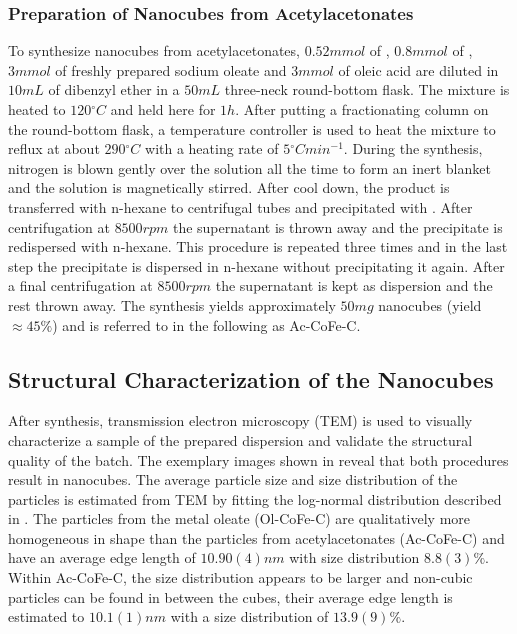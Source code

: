 \documentclass[\main/dresen_thesis.tex]{subfiles}
\begin{document}
    \subsubsection{Preparation of Nanocubes from Acetylacetonates}
      To synthesize nanocubes from acetylacetonates, $0.52 \unit{mmol}$ of , $0.8 \unit{mmol}$ of , $3 \unit{mmol}$ of freshly prepared sodium oleate and $3 \unit{mmol}$ of oleic acid are diluted in $10 \unit{mL}$ of dibenzyl ether in a $50 \unit{mL}$ three-neck round-bottom flask.
      The mixture is heated to $120 \unit{^\circ C}$ and held here for $1 \unit{h}$.
      After putting a fractionating column on the round-bottom flask, a temperature controller is used to heat the mixture to reflux at about $290 \unit{^\circ C}$ with a heating rate of $5 \unit{^\circ C min^{-1}}$.
      During the synthesis, nitrogen is blown gently over the solution all the time to form an inert blanket and the solution is magnetically stirred.
      After cool down, the product is transferred with n-hexane to centrifugal tubes and precipitated with .
      After centrifugation at $8500 \unit{rpm}$ the supernatant is thrown away and the precipitate is redispersed with n-hexane.
      This procedure is repeated three times and in the last step the precipitate is dispersed in n-hexane without precipitating it again.
      After a final centrifugation at $8500 \unit{rpm}$ the supernatant is kept as dispersion and the rest thrown away.
      The synthesis yields approximately $50 \unit{mg}$ nanocubes (yield $\approx 45 \%$) and is referred to in the following as Ac-CoFe-C.

  \subsection{Structural Characterization of the Nanocubes}
  \label{sec:monolayers:nanoparticle:structuralCharacterization}
    After synthesis, transmission electron microscopy (TEM) is used to visually characterize a sample of the prepared dispersion and validate the structural quality of the batch.
    The exemplary images shown in  reveal that both procedures result in nanocubes.
    The average particle size and size distribution of the particles is estimated from TEM by fitting the log-normal distribution described in .
    The particles from the metal oleate (Ol-CoFe-C) are qualitatively more homogeneous in shape than the particles from acetylacetonates (Ac-CoFe-C) and have an average edge length of $10.90(4) \unit{nm}$ with size distribution $8.8(3) \unit{\%}$.
    Within Ac-CoFe-C, the size distribution appears to be larger and non-cubic particles can be found in between the cubes, their average edge length is estimated to $10.1(1) \unit{nm}$ with a size distribution of $13.9(9) \unit{\%}$.
\end{document}
